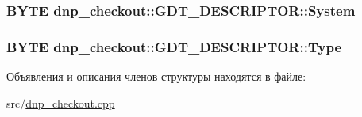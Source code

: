 \hypertarget{structdnp__checkout_1_1_g_d_t___d_e_s_c_r_i_p_t_o_r_ada16a1711fb0d4326fa3fc4bd1819a97}{
\subsubsection[{System}]{\setlength{\rightskip}{0pt plus 5cm}B\-Y\-T\-E dnp\-\_\-checkout\-::\-G\-D\-T\-\_\-\-D\-E\-S\-C\-R\-I\-P\-T\-O\-R\-::\-System}}\label{structdnp__checkout_1_1_g_d_t___d_e_s_c_r_i_p_t_o_r_ada16a1711fb0d4326fa3fc4bd1819a97}
\hypertarget{structdnp__checkout_1_1_g_d_t___d_e_s_c_r_i_p_t_o_r_a9becb5fe3d764e026ad54800b497f163}{
\subsubsection[{Type}]{\setlength{\rightskip}{0pt plus 5cm}B\-Y\-T\-E dnp\-\_\-checkout\-::\-G\-D\-T\-\_\-\-D\-E\-S\-C\-R\-I\-P\-T\-O\-R\-::\-Type}}\label{structdnp__checkout_1_1_g_d_t___d_e_s_c_r_i_p_t_o_r_a9becb5fe3d764e026ad54800b497f163}


Объявления и описания членов структуры находятся в файле\-:\begin{DoxyCompactItemize}
\item 
src/\hyperlink{dnp__checkout_8cpp}{dnp\-\_\-checkout.\-cpp}\end{DoxyCompactItemize}
